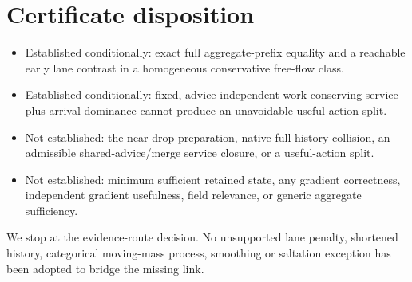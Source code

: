 \documentclass[11pt]{article}
\begin{document}
\section{Certificate disposition}
\begin{itemize}
\item Established conditionally: exact full aggregate-prefix equality and a
reachable early lane contrast in a homogeneous conservative free-flow class.
\item Established conditionally: fixed, advice-independent work-conserving
service plus arrival dominance cannot produce an unavoidable useful-action split.
\item Not established: the near-drop preparation, native full-history collision,
an admissible shared-advice/merge service closure, or a useful-action split.
\item Not established: minimum sufficient retained state, any gradient correctness,
independent gradient usefulness, field relevance, or generic aggregate sufficiency.
\end{itemize}
We stop at the evidence-route decision. No unsupported lane penalty, shortened
history, categorical moving-mass process, smoothing or saltation exception has
been adopted to bridge the missing link.
\end{document}
